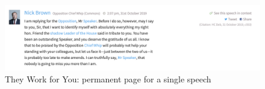 \begin{figure}[h]
  \centering
  \includegraphics[scale=0.3]{images/they-work-for-you-implementation-permanent-urls-2}
  \caption{They Work for You: permanent page for a single speech}
  \label{fig:they-work-for-you-implementation-permanent-urls-2}
\end{figure}